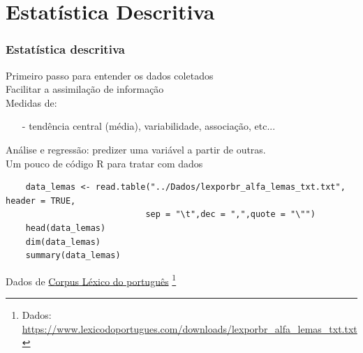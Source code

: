 \documentclass[graphics,14pt]{beamer}
\newcommand{\lfr}[1]{\let\thefootnote\relax\footnote{\hspace{0.6cm}\vspace{1.25cm} #1}}
\begin{document}
\section{Estatística Descritiva}
\begin{frame}[t,fragile=singleslide]
\frametitle{Estatística descritiva}
	Primeiro passo para entender os dados coletados\\
	Facilitar a assimilação de informação\\
	Medidas de:
	\begin{itemize}
		\item[-] tendência central (média), variabilidade, associação, etc...
	\end{itemize}
	Análise e regressão: predizer uma variável a partir de outras.\\
	\vspace{1.0cm}
	Um pouco de código R para tratar com dados
	\begin{lstlisting}
	data_lemas <- read.table("../Dados/lexporbr_alfa_lemas_txt.txt", header = TRUE, 
							sep = "\t",dec = ",",quote = "\"")
	head(data_lemas)
	dim(data_lemas)
	summary(data_lemas)
	\end{lstlisting}
	\vspace{1.0cm}	
	Dados de \href{https://www.lexicodoportugues.com/}{Corpus Léxico do português}
	\vfill
	\lfr{Dados: \url{https://www.lexicodoportugues.com/downloads/lexporbr_alfa_lemas_txt.txt}}

\end{frame}
\end{document}

